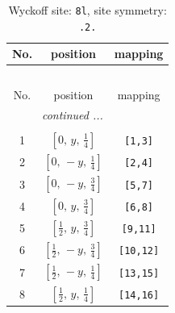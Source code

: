 \documentclass[fleqn,8pt]{jsarticle}
\begin{document}
\begin{longtable}{ccc}
\caption{Wyckoff site: {\tt 8l}, site symmetry: {\tt .2.}}
 \\
 \hline \hline
No. & position & mapping \\ \hline \endfirsthead

\multicolumn{2}{l}{\tablename\ \thetable{}} \\
 \hline \hline
No. & position & mapping \\ \hline \endhead

 \hline \hline
\multicolumn{2}{r}{\footnotesize\it continued ...} \\ \endfoot

 \hline \hline
\multicolumn{2}{r}{} \\ \endlastfoot

1 & $\left[ 0,\, y,\, \frac{1}{4} \right]$ & {\tt [1,3]} \\ \hline
2 & $\left[ 0,\, - y,\, \frac{1}{4} \right]$ & {\tt [2,4]} \\ \hline
3 & $\left[ 0,\, - y,\, \frac{3}{4} \right]$ & {\tt [5,7]} \\ \hline
4 & $\left[ 0,\, y,\, \frac{3}{4} \right]$ & {\tt [6,8]} \\ \hline
5 & $\left[ \frac{1}{2},\, y,\, \frac{3}{4} \right]$ & {\tt [9,11]} \\ \hline
6 & $\left[ \frac{1}{2},\, - y,\, \frac{3}{4} \right]$ & {\tt [10,12]} \\ \hline
7 & $\left[ \frac{1}{2},\, - y,\, \frac{1}{4} \right]$ & {\tt [13,15]} \\ \hline
8 & $\left[ \frac{1}{2},\, y,\, \frac{1}{4} \right]$ & {\tt [14,16]} \\
\end{longtable}
\renewcommand{\arraystretch}{1.2}
\end{document}
